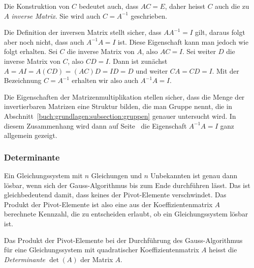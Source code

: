 Die Konstruktion von $C$ bedeutet auch, dass $AC=E$, daher heisst $C$ auch
die zu $A$ {\em inverse Matrix}.
Sie wird auch $C=A^{-1}$ geschrieben.

Die Definition der inversen Matrix stellt sicher, dass $AA^{-1}=I$ gilt,
daraus folgt aber noch nicht, dass auch $A^{-1}A=I$ ist.
Diese Eigenschaft kann man jedoch wie folgt erhalten.
Sei $C$ die inverse Matrix von $A$, also $AC=I$.
Sei weiter $D$ die inverse Matrix von $C$, also $CD=I$.
Dann ist zunächst $A=AI=A(CD)=(AC)D=ID=D$ und weiter
$CA=CD=I$.
Mit der Bezeichnung $C=A^{-1}$ erhalten wir also auch $A^{-1}A=I$.

Die Eigenschaften der Matrizenmultiplikation stellen sicher,
dass die Menge der invertierbaren Matrizen eine Struktur bilden,
die man Gruppe nennt, die in Abschnitt~\ref{buch:grundlagen:subsection:gruppen}
genauer untersucht wird.
In diesem Zusammenhang wird dann auf
Seite~\pageref{buch:vektorenmatrizen:satz:gruppenregeln}
die Eigenschaft $A^{-1}A=I$ ganz allgemein gezeigt.

\subsubsection{Determinante}
Ein Gleichungssystem mit $n$ Gleichungen und $n$ Unbekannten ist genau
dann lösbar, wenn sich der Gauss-Algorithmus bis zum Ende durchführen lässt.
Das ist gleichbedeutend damit, dass keines der Pivot-Elemente verschwindet.
Das Produkt der Pivot-Elemente ist also eine aus der Koeffizientenmatrix
$A$ berechnete Kennzahl, die zu entscheiden erlaubt, ob ein Gleichungssystem
lösbar ist.

\begin{definition}
\label{buch:linear:determinate:def}
Das Produkt der Pivot-Elemente bei der Durchführung des Gauss-Algorithmus
für eine Gleichungssystem mit quadratischer Koeffizientenmatrix $A$
heisst die {\em Determinante} $\det(A)$ der Matrix $A$.
%
\end{definition}

